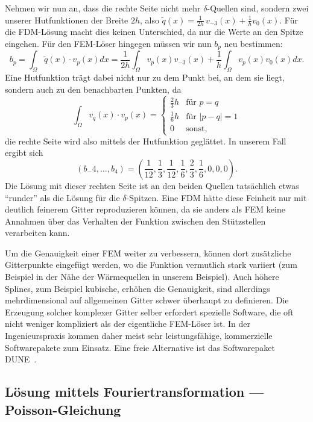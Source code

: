 Nehmen wir nun an, dass die rechte Seite nicht mehr $\delta$-Quellen sind, sondern zwei unserer Hutfunktionen der Breite $2h$, also $\tilde q(x)= \frac{1}{2h}\,v_{-3}(x) + \frac{1}{h}v_0(x)$. Für die FDM-Lösung macht dies keinen Unterschied, da nur die Werte an den Spitze eingehen. Für den FEM-Löser hingegen müssen wir nun $b_p$ neu bestimmen:
\begin{equation}
  b_p = \int_\Omega \tilde q(x)\cdot v_p(x) dx = \frac{1}{2h}\int_\Omega v_p(x) v_{-3}(x) + \frac{1}{h}\int_\Omega v_p(x) v_0(x) dx.
\end{equation}
Eine Hutfunktion trägt dabei nicht nur zu dem Punkt bei, an dem sie liegt, sondern auch zu den benachbarten Punkten, da
\begin{equation}
  \int_\Omega v_q(x)\cdot v_p(x) =
  	\begin{cases}
	\frac{2}{3}h & \text{für } p=q \\
	\frac{1}{6}h & \text{für } \lvert p - q \rvert = 1\\
	0 & \text{sonst,}
	\end{cases}
\end{equation}
die rechte Seite wird also mittels der Hutfunktion geglättet. In unserem Fall ergibt sich
\begin{equation}
(b_-4,\ldots,b_4) = (\frac{1}{12},\frac{1}{3},\frac{1}{12},\frac{1}{6},\frac{2}{3},\frac{1}{6}, 0, 0, 0).
\end{equation}
Die Lösung mit dieser rechten Seite ist an den beiden Quellen tatsächlich etwas \enquote{runder} als die Lösung für die $\delta$-Spitzen. Eine FDM hätte diese Feinheit nur mit deutlich feinerem Gitter reproduzieren können, da sie anders als FEM keine Annahmen über das Verhalten der Funktion zwischen den Stützstellen verarbeiten kann.

Um die Genauigkeit einer FEM weiter zu verbessern, können dort zusätzliche Gitterpunkte
eingefügt werden, wo die Funktion vermutlich stark variiert (zum Beispiel in der
Nähe der Wärmequellen in unserem Beispiel). Auch höhere Splines, zum Beispiel kubische, erhöhen die Genauigkeit, sind allerdings mehrdimensional auf allgemeinen Gitter schwer überhaupt zu definieren. Die Erzeugung solcher komplexer Gitter selber erfordert
spezielle Software, die oft nicht weniger kompliziert als der eigentliche
FEM-Löser ist. In der Ingenieurspraxis kommen daher meist sehr leistungsfähige,
kommerzielle Softwarepakete zum Einsatz. Eine freie Alternative ist das Softwarepaket
DUNE~\cite{dune,duneweb}.

\subsection{Lösung mittels Fouriertransformation --- Poisson-Gleichung}

